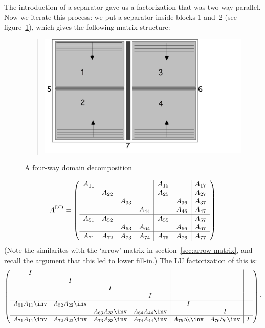 The introduction of a separator gave us a factorization that was
two-way parallel. Now we iterate this process: we put a
separator inside blocks 1 and~2 (see figure~\ref{fig:domdecomp2}),
which gives the following matrix structure:
\begin{figure}[ht]
  \begin{quote}
    \includegraphics[scale=.11]{graphics-public/domdecomp2}
  \end{quote}
  \caption{A four-way domain decomposition}
  \label{fig:domdecomp2}
\end{figure}
\[
  A^{\mathrm{DD}}=
  \left(\begin{array}{cccc|cc|c}
    A_{11}&     &     &     &A_{15}&     &A_{17}\\
         &A_{22}&     &     &A_{25}&     &A_{27}\\
         &     &A_{33}&     &     &A_{36}&A_{37}\\
         &     &     &A_{44}&     &A_{46}&A_{47}\\ \hline
    A_{51}&A_{52}&    &     &A_{55}&      &A_{57}\\
         &      &A_{63}&A_{64}&    &A_{66}&A_{67}\\ \hline
    A_{71}&A_{72}&A_{73}&A_{74}&A_{75}&A_{76}&A_{77}
  \end{array}\right)
\]
(Note the similarites with the `arrow' matrix in
section~\ref{sec:arrow-matrix}, and recall the argument that this led
to lower fill-in.)
The LU factorization of this is:
\[
  \left(\begin{array}{cccc|cc|c}
        I&     &     &     &      &     &\\
         &I    &     &     &      &     &\\
         &     &I    &     &      &     &\\
         &     &     &I    &      &     &\\ \hline
    A_{51}A_{11}\inv&A_{52}A_{22}\inv&    &     &I    &      &\\
         &      &A_{63}A_{33}\inv&A_{64}A_{44}\inv&   &I     &\\ \hline
    A_{71}A_{11}\inv&A_{72}A_{22}\inv&A_{73}A_{33}\inv&A_{74}A_{44}\inv&
    A_{75}S_5\inv&A_{76}S_6\inv&I
  \end{array}\right) \cdot
\]
